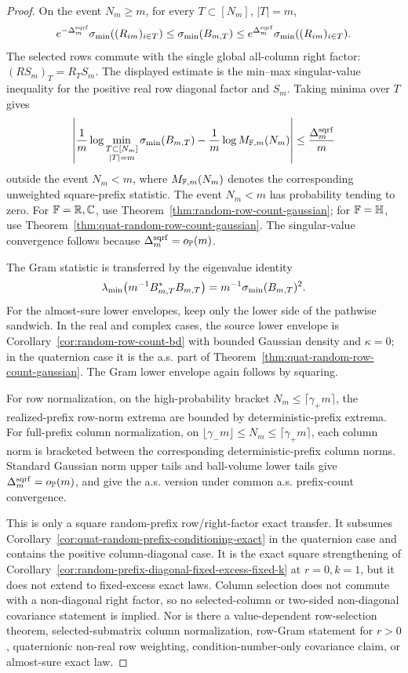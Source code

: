 \begin{proof}
On the event \(N_m\ge m\), for every \(T\subset[N_m]\), \(|T|=m\),
\[
  e^{-\Delta_m^{\rm sqrf}}\sigma_{\min}((R_{im})_{i\in T})
  \le \sigma_{\min}(B_{m,T})
  \le e^{\Delta_m^{\rm sqrf}}\sigma_{\min}((R_{im})_{i\in T}).
\]
The selected rows commute with the single global all-column right factor:
\((R S_m)_T=R_T S_m\).  The displayed estimate is the min--max singular-value
inequality for the positive real row diagonal factor and \(S_m\).  Taking minima
over \(T\) gives
\[
  \left|
  \frac1m\log
  \min_{\substack{T\subset[N_m]\\ |T|=m}}\sigma_{\min}(B_{m,T})
  -
  \frac1m\log M_{\mathbb{F},m}(N_m)
  \right|
  \le \frac{\Delta_m^{\rm sqrf}}m
\]
outside the event \(N_m<m\), where \(M_{\mathbb{F},m}(N_m)\) denotes the corresponding
unweighted square-prefix statistic.  The event \(N_m<m\) has probability
tending to zero.  For \(\mathbb{F}=\mathbb{R},\mathbb{C}\), use
Theorem~\ref{thm:random-row-count-gaussian}; for \(\mathbb{F}=\mathbb{H}\), use
Theorem~\ref{thm:quat-random-row-count-gaussian}.  The singular-value
convergence follows because \(\Delta_m^{\rm sqrf}=o_{\mathbb{P}}(m)\).

The Gram statistic is transferred by the eigenvalue identity
\[
  \lambda_{\min}\!\left(m^{-1}B_{m,T}^*B_{m,T}\right)
  =m^{-1}\sigma_{\min}(B_{m,T})^2.
\]
For the almost-sure lower envelopes, keep only the lower side of the pathwise
sandwich.  In the real and complex cases, the source lower envelope is
Corollary~\ref{cor:random-row-count-bd} with bounded Gaussian density and
\(\kappa=0\); in the quaternion case it is the a.s. part of
Theorem~\ref{thm:quat-random-row-count-gaussian}.  The Gram lower envelope
again follows by squaring.

For row normalization, on the high-probability bracket
\(N_m\le\lceil\gamma_+m\rceil\), the realized-prefix row-norm extrema are bounded
by deterministic-prefix extrema.  For full-prefix column normalization, on
\(\lfloor\gamma_-m\rfloor\le N_m\le\lceil\gamma_+m\rceil\), each column norm is
bracketed between the corresponding deterministic-prefix column norms.  Standard
Gaussian norm upper tails and ball-volume lower tails give
\(\Delta_m^{\rm sqrf}=o_{\mathbb{P}}(m)\), and give the a.s. version under common
a.s. prefix-count convergence.

This is only a square random-prefix row/right-factor exact transfer.  It
subsumes Corollary~\ref{cor:quat-random-prefix-conditioning-exact} in the
quaternion case and contains the positive column-diagonal case.  It is the exact square
strengthening of Corollary~\ref{cor:random-prefix-diagonal-fixed-excess-fixed-k}
at \(r=0,k=1\), but it does not extend to fixed-excess exact laws.  Column
selection does not commute with a non-diagonal right factor, so no
selected-column or two-sided non-diagonal covariance statement is implied.  Nor
is there a value-dependent row-selection theorem, selected-submatrix column
normalization, row-Gram statement for \(r>0\), quaternionic non-real row
weighting, condition-number-only covariance claim, or almost-sure exact law.
\end{proof}

